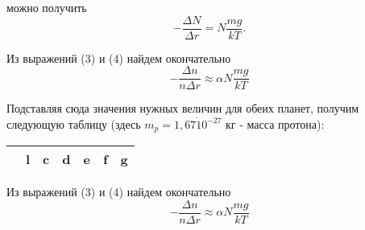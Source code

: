 \documentclass[a4paper, 9pt]{article}
\begin{document}
    \begin{multicols}{2}
        []
        можно получить
        \begin{equation} 
            - \frac{\Delta N}{\Delta r} = N \frac{mg}{kT}.
        \end{equation}
        
        Из выражений (3) и (4) найдем окончательно
        \begin{equation*}
            -\frac{\Delta n}{n \Delta r} \approx \alpha N \frac{mg}{kT}
        \end{equation*}

        Подставляя сюда значения нужных величин для обеих планет, 
        получим следующую таблицу (здесь $m_p = 1,67 \dot 10^{-27}$ кг - масса протона):
        
        \begin{tabular}{ | m{1cm} | m{1cm} | m{1cm} | m{1cm} | m{1cm} | m{1cm} | m{1cm} | } 
            \hline
             & l & c & d & e & f & g \\
            \hline
        \end{tabular}

        \columnbreak
        Из выражений (3) и (4) найдем окончательно
        \begin{equation*}
            -\frac{\Delta n}{n \Delta r} \approx \alpha N \frac{mg}{kT}
        \end{equation*}
    \end{multicols}
\end{document}
